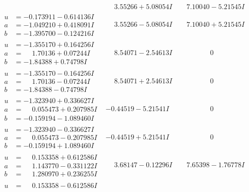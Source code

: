 \documentclass[1p]{elsarticle_modified}
\theoremstyle{definition}
\begin{document}
$$\begin{array}{c|c|c}
 & \phantom{-}3.55266 + 5.08054 I & \phantom{-}7.10040 - 5.21545 I \\ \hline\begin{aligned}
u &= -0.173911 - 0.614136 I \\
a &= -1.049210 + 0.418091 I \\
b &= -1.395700 - 0.124216 I\end{aligned}
 & \phantom{-}3.55266 - 5.08054 I & \phantom{-}7.10040 + 5.21545 I \\ \hline\begin{aligned}
u &= -1.355170 + 0.164256 I \\
a &= \phantom{-}1.70136 + 0.07244 I \\
b &= -1.84388 + 0.74798 I\end{aligned}
 & \phantom{-}8.54071 - 2.54613 I & \phantom{-0.000000 } 0 \\ \hline\begin{aligned}
u &= -1.355170 - 0.164256 I \\
a &= \phantom{-}1.70136 - 0.07244 I \\
b &= -1.84388 - 0.74798 I\end{aligned}
 & \phantom{-}8.54071 + 2.54613 I & \phantom{-0.000000 } 0 \\ \hline\begin{aligned}
u &= -1.323940 + 0.336627 I \\
a &= \phantom{-}0.055473 + 0.207985 I \\
b &= -0.159194 - 1.089460 I\end{aligned}
 & -0.44519 - 5.21541 I & \phantom{-0.000000 } 0 \\ \hline\begin{aligned}
u &= -1.323940 - 0.336627 I \\
a &= \phantom{-}0.055473 - 0.207985 I \\
b &= -0.159194 + 1.089460 I\end{aligned}
 & -0.44519 + 5.21541 I & \phantom{-0.000000 } 0 \\ \hline\begin{aligned}
u &= \phantom{-}0.153358 + 0.612586 I \\
a &= \phantom{-}1.143770 - 0.331122 I \\
b &= \phantom{-}1.280970 + 0.236255 I\end{aligned}
 & \phantom{-}3.68147 - 0.12296 I & \phantom{-}7.65398 - 1.76778 I \\ \hline\begin{aligned}
u &= \phantom{-}0.153358 - 0.612586 I \\

\end{aligned}
\end{array}$$
\end{document}

